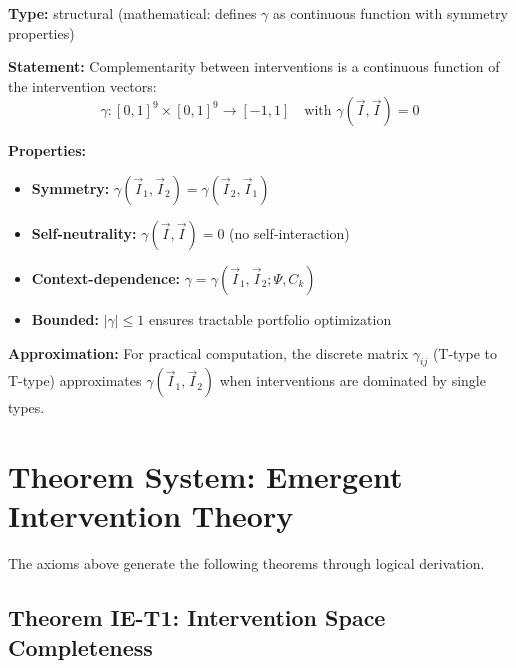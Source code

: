 \begin{tcolorbox}[colback=blue!5!white, colframe=blue!75!black,
    title=\textbf{Axiom EIT-15: General Complementarity Function}]

\textbf{Type:} structural (mathematical: defines $\gamma$ as continuous function with symmetry properties)

\textbf{Statement:} Complementarity between interventions is a continuous function of the intervention vectors:
\begin{equation}
\boxed{\gamma: [0,1]^9 \times [0,1]^9 \rightarrow [-1, 1] \quad \text{with } \gamma(\vec{I}, \vec{I}) = 0}
\label{eq:ie-general-gamma}
\end{equation}

\textbf{Properties:}
\begin{itemize}[nosep]
    \item \textbf{Symmetry:} $\gamma(\vec{I}_1, \vec{I}_2) = \gamma(\vec{I}_2, \vec{I}_1)$
    \item \textbf{Self-neutrality:} $\gamma(\vec{I}, \vec{I}) = 0$ (no self-interaction)
    \item \textbf{Context-dependence:} $\gamma = \gamma(\vec{I}_1, \vec{I}_2; \Psi, C_k)$
    \item \textbf{Bounded:} $|\gamma| \leq 1$ ensures tractable portfolio optimization
\end{itemize}

\textbf{Approximation:} For practical computation, the discrete matrix $\gamma_{ij}$ (T-type to T-type) approximates $\gamma(\vec{I}_1, \vec{I}_2)$ when interventions are dominated by single types.

\end{tcolorbox}


\section{Theorem System: Emergent Intervention Theory}
\label{sec:ie-theorems}

The axioms above generate the following theorems through logical derivation.

\subsection{Theorem IE-T1: Intervention Space Completeness}

